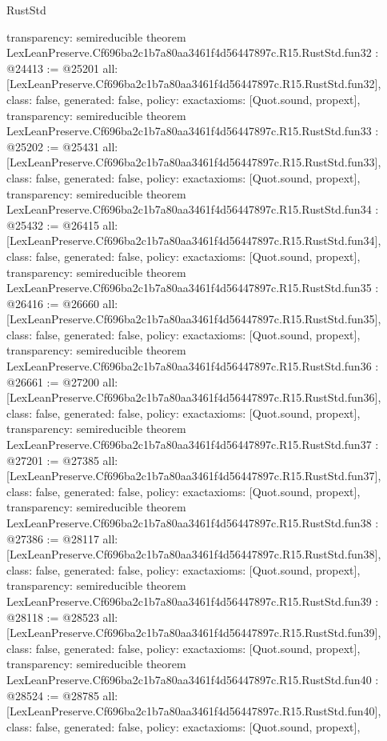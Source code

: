 \begin{lexlean}{RustStd}
\begin{coremodule}
{  transparency: semireducible
}
theorem LexLeanPreserve.Cf696ba2c1b7a80aa3461f4d56447897c.R15.RustStd.fun32 : @24413 := @25201 {
  all: [LexLeanPreserve.Cf696ba2c1b7a80aa3461f4d56447897c.R15.RustStd.fun32],
  class: false,
  generated: false,
  policy: exact{axioms: [Quot.sound, propext]},
  transparency: semireducible
}
theorem LexLeanPreserve.Cf696ba2c1b7a80aa3461f4d56447897c.R15.RustStd.fun33 : @25202 := @25431 {
  all: [LexLeanPreserve.Cf696ba2c1b7a80aa3461f4d56447897c.R15.RustStd.fun33],
  class: false,
  generated: false,
  policy: exact{axioms: [Quot.sound, propext]},
  transparency: semireducible
}
theorem LexLeanPreserve.Cf696ba2c1b7a80aa3461f4d56447897c.R15.RustStd.fun34 : @25432 := @26415 {
  all: [LexLeanPreserve.Cf696ba2c1b7a80aa3461f4d56447897c.R15.RustStd.fun34],
  class: false,
  generated: false,
  policy: exact{axioms: [Quot.sound, propext]},
  transparency: semireducible
}
theorem LexLeanPreserve.Cf696ba2c1b7a80aa3461f4d56447897c.R15.RustStd.fun35 : @26416 := @26660 {
  all: [LexLeanPreserve.Cf696ba2c1b7a80aa3461f4d56447897c.R15.RustStd.fun35],
  class: false,
  generated: false,
  policy: exact{axioms: [Quot.sound, propext]},
  transparency: semireducible
}
theorem LexLeanPreserve.Cf696ba2c1b7a80aa3461f4d56447897c.R15.RustStd.fun36 : @26661 := @27200 {
  all: [LexLeanPreserve.Cf696ba2c1b7a80aa3461f4d56447897c.R15.RustStd.fun36],
  class: false,
  generated: false,
  policy: exact{axioms: [Quot.sound, propext]},
  transparency: semireducible
}
theorem LexLeanPreserve.Cf696ba2c1b7a80aa3461f4d56447897c.R15.RustStd.fun37 : @27201 := @27385 {
  all: [LexLeanPreserve.Cf696ba2c1b7a80aa3461f4d56447897c.R15.RustStd.fun37],
  class: false,
  generated: false,
  policy: exact{axioms: [Quot.sound, propext]},
  transparency: semireducible
}
theorem LexLeanPreserve.Cf696ba2c1b7a80aa3461f4d56447897c.R15.RustStd.fun38 : @27386 := @28117 {
  all: [LexLeanPreserve.Cf696ba2c1b7a80aa3461f4d56447897c.R15.RustStd.fun38],
  class: false,
  generated: false,
  policy: exact{axioms: [Quot.sound, propext]},
  transparency: semireducible
}
theorem LexLeanPreserve.Cf696ba2c1b7a80aa3461f4d56447897c.R15.RustStd.fun39 : @28118 := @28523 {
  all: [LexLeanPreserve.Cf696ba2c1b7a80aa3461f4d56447897c.R15.RustStd.fun39],
  class: false,
  generated: false,
  policy: exact{axioms: [Quot.sound, propext]},
  transparency: semireducible
}
theorem LexLeanPreserve.Cf696ba2c1b7a80aa3461f4d56447897c.R15.RustStd.fun40 : @28524 := @28785 {
  all: [LexLeanPreserve.Cf696ba2c1b7a80aa3461f4d56447897c.R15.RustStd.fun40],
  class: false,
  generated: false,
  policy: exact{axioms: [Quot.sound, propext]},
}
\end{coremodule}
\end{lexlean}
